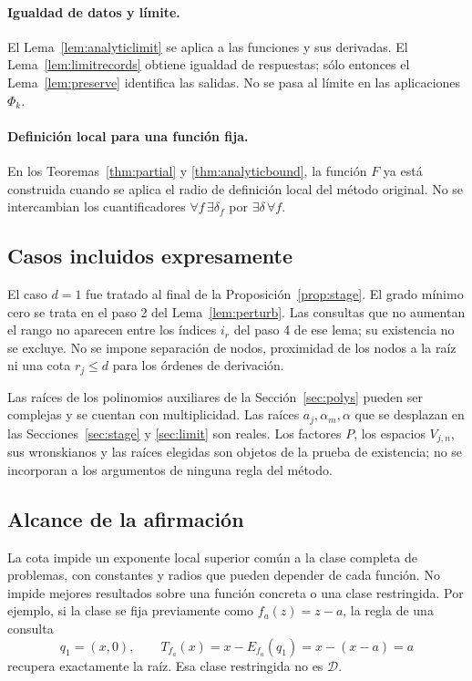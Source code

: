 \documentclass[11pt,a4paper]{article}
\numberwithin{equation}{section}
\theoremstyle{definition}
\theoremstyle{remark}
\newcommand{\DD}{\mathcal D}
\begin{document}
\paragraph{Igualdad de datos y límite.}
El Lema~\ref{lem:analyticlimit} se aplica a las funciones y sus derivadas. El Lema~\ref{lem:limitrecords} obtiene igualdad de respuestas; sólo entonces el Lema~\ref{lem:preserve} identifica las salidas. No se pasa al límite en las aplicaciones $\Phi_k$.

\paragraph{Definición local para una función fija.}
En los Teoremas~\ref{thm:partial} y \ref{thm:analyticbound}, la función $F$ ya está construida cuando se aplica el radio de definición local del método original. No se intercambian los cuantificadores $\forall f\,\exists\delta_f$ por $\exists\delta\,\forall f$.

\subsection{Casos incluidos expresamente}
El caso $d=1$ fue tratado al final de la Proposición~\ref{prop:stage}. El grado mínimo cero se trata en el paso 2 del Lema~\ref{lem:perturb}. Las consultas que no aumentan el rango no aparecen entre los índices $i_r$ del paso 4 de ese lema; su existencia no se excluye. No se impone separación de nodos, proximidad de los nodos a la raíz ni una cota $r_j\le d$ para los órdenes de derivación.

Las raíces de los polinomios auxiliares de la Sección~\ref{sec:polys} pueden ser complejas y se cuentan con multiplicidad. Las raíces $a_j,\alpha_m,\alpha$ que se desplazan en las Secciones~\ref{sec:stage} y \ref{sec:limit} son reales. Los factores $P$, los espacios $V_{j,n}$, sus wronskianos y las raíces elegidas son objetos de la prueba de existencia; no se incorporan a los argumentos de ninguna regla del método.

\subsection{Alcance de la afirmación}
La cota impide un exponente local superior común a la clase completa de problemas, con constantes y radios que pueden depender de cada función. No impide mejores resultados sobre una función concreta o una clase restringida. Por ejemplo, si la clase se fija previamente como $f_a(z)=z-a$, la regla de una consulta
\[
q_1=(x,0),\qquad T_{f_a}(x)=x-E_{f_a}(q_1)
=x-(x-a)=a
\]
recupera exactamente la raíz. Esa clase restringida no es $\DD$.
\end{document}
